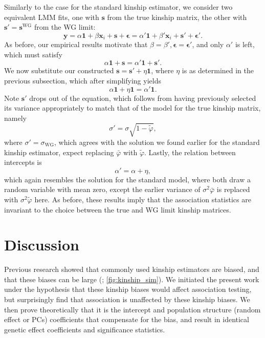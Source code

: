 \documentclass[11pt]{article}
\begin{document}
Similarly to the case for the standard kinship estimator, we consider two equivalent LMM fits, one with $\mathbf{s}$ from the true kinship matrix, the other with $\mathbf{s}' = \mathbf{s}^\text{WG}$ from the WG limit:
$$
\mathbf{y}
=
\alpha \mathbf{1} + \beta \mathbf{x}_i + \mathbf{s} + \boldsymbol{\epsilon}
=
\alpha' \mathbf{1} + \beta' \mathbf{x}_i + \mathbf{s}' + \boldsymbol{\epsilon}'
.
$$
As before, our empirical results motivate that $\beta = \beta', \boldsymbol{\epsilon} = \boldsymbol{\epsilon}'$, and only $\alpha'$ is left, which must satisfy
$$
\alpha \mathbf{1} + \mathbf{s}
=
\alpha' \mathbf{1} + \mathbf{s}'
.
$$
We now substitute our constructed $\mathbf{s} = \mathbf{s}' + \eta \mathbf{1}$, where $\eta$ is as determined in the previous subsection, which after simplifying yields
$$
\alpha \mathbf{1} + \eta \mathbf{1}
=
\alpha' \mathbf{1}
.
$$
Note $\mathbf{s}'$ drops out of the equation, which follows from having previously selected its variance appropriately to match that of the model for the true kinship matrix, namely
$$
\sigma' = \sigma \sqrt{ 1 - \tilde{\varphi} },
$$
where $\sigma' = \sigma_\text{WG}$, which agrees with the solution we found earlier for the standard kinship estimator, expect replacing $\bar{\varphi}$ with $\tilde{\varphi}$.
Lastly, the relation between intercepts is
$$
\alpha' = \alpha + \eta,
$$
which again resembles the solution for the standard model, where both draw a random variable with mean zero, except the earlier variance of $\sigma^2 \bar{\varphi}$ is replaced with $\sigma^2 \tilde{\varphi}$ here.
As before, these results imply that the association statistics are invariant to the choice between the true and WG limit kinship matrices.





\section{Discussion}

Previous research showed that commonly used kinship estimators are biased, and that these biases can be large (\citet{ochoa_estimating_2021}; \cref{fig:kinship_sim}).
We initiated the present work under the hypothesis that these kinship biases would affect association testing, but surprisingly find that association is unaffected by these kinship biases.
We then prove theoretically that it is the intercept and population structure (random effect or PCs) coefficients that compensate for the bias, and result in identical genetic effect coefficients and significance statistics.
\end{document}

